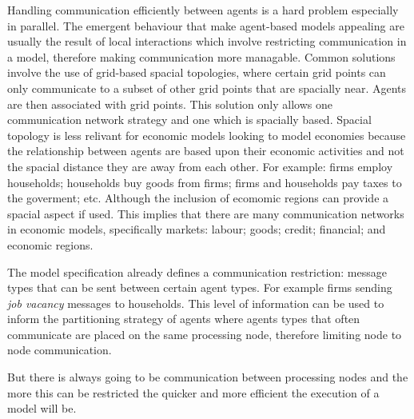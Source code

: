 \documentclass{aamas2009}
\begin{document}
Handling communication efficiently between agents is a hard problem especially
in parallel. The emergent behaviour that make agent-based models appealing are
usually the result of local interactions which involve restricting
communication in a model, therefore making communication more managable.
Common solutions involve the use of grid-based spacial topologies, where
certain grid points can only communicate to a subset of other grid points that
are spacially near. Agents are then associated with grid points.
This solution only allows one communication network strategy and one which is
spacially based.
Spacial topology is less relivant for economic models looking to model economies
because the relationship between agents are based upon their economic activities
and not the spacial distance they are away from each other. For example: firms
employ households; households buy goods from firms; firms and households pay
taxes to the goverment; etc. Although the inclusion of ecomomic regions can
provide a spacial aspect if used. This implies that there are many
communication networks in economic models, specifically markets: labour; goods;
credit; financial; and economic regions.

The model specification already defines a communication restriction: message
types that can be sent between certain agent types. For example firms sending
\textit{job vacancy} messages to households.
This level of information can be used to inform the partitioning strategy of
agents where agents types that often communicate are placed on the same
processing node, therefore limiting node to node communication.

But there is always going to be communication between processing nodes and the
more this can be restricted the quicker and more efficient the execution of a
model will be.





% 
\end{document}
